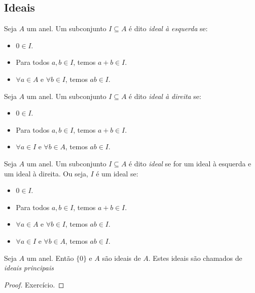 \subsection{Ideais}
\begin{definition}
    Seja $A$ um anel. Um subconjunto $I \subseteq A$ é dito \emph{ideal à esquerda} se:
    \begin{itemize}
        \item $0 \in I$.
        \item Para todos $a, b \in I$, temos $a+b\in I$.
        \item $\forall a \in A$ e $\forall b \in I$, temos $ab \in I$.
    \end{itemize}
\end{definition}

\begin{definition}
    Seja $A$ um anel. Um subconjunto $I \subseteq A$ é dito \emph{ideal à direita} se:
    \begin{itemize}
        \item $0 \in I$.
        \item Para todos $a, b \in I$, temos $a+b\in I$.
        \item $\forall a \in I$ e $\forall b \in A$, temos $ab \in I$.
    \end{itemize}
\end{definition}

\begin{definition}[Ideal]
    Seja $A$ um anel. Um subconjunto $I \subseteq A$ é dito \emph{ideal} se for um ideal à esquerda e um ideal à direita. Ou seja, $I$ é um ideal se:
    \begin{itemize}
        \item $0 \in I$.
        \item Para todos $a, b \in I$, temos $a+b\in I$.
        \item $\forall a \in A$ e $\forall b \in I$, temos $ab \in I$.
        \item $\forall a \in I$ e $\forall b \in A$, temos $ab \in I$.

    \end{itemize}
\end{definition}

\begin{prop}Seja $A$ um anel. Então $\{0\}$ e $A$ são ideais de $A$. Estes ideais são chamados de \emph{ideais principais}
\end{prop}
\begin{proof}
    Exercício.
\end{proof}

